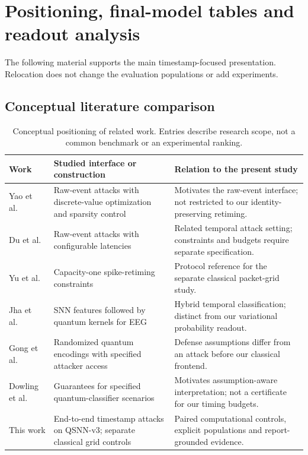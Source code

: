 \section{Positioning, final-model tables and readout analysis}
\label{sec:revision_details}
The following material supports the main timestamp-focused presentation. Relocation does not change the evaluation populations or add experiments.

\subsection{Conceptual literature comparison}
\begin{table}[H]
\centering
\small
\caption{Conceptual positioning of related work. Entries describe research scope, not a common benchmark or an experimental ranking.}
\label{tab:supp_literature_scope}
\begin{tabular}{p{}p{}p{}}
\hline
Work & Studied interface or construction & Relation to the present study \\
\hline
Yao et al.\ \cite{yao2024rawevent} & Raw-event attacks with discrete-value optimization and sparsity control & Motivates the raw-event interface; not restricted to our identity-preserving retiming. \\
Du et al.\ \cite{du2026latencies} & Raw-event attacks with configurable latencies & Related temporal attack setting; constraints and budgets require separate specification. \\
Yu et al.\ \cite{yu2026} & Capacity-one spike-retiming constraints & Protocol reference for the separate classical packet-grid study. \\
Jha et al.\ \cite{jha2025hybrid} & SNN features followed by quantum kernels for EEG & Hybrid temporal classification; distinct from our variational probability readout. \\
Gong et al.\ \cite{gong2024randomized} & Randomized quantum encodings with specified attacker access & Defense assumptions differ from an attack before our classical frontend. \\
Dowling et al.\ \cite{dowling2026guarantees} & Guarantees for specified quantum-classifier scenarios & Motivates assumption-aware interpretation; not a certificate for our timing budgets. \\
This work & End-to-end timestamp attacks on QSNN-v3; separate classical grid controls & Paired computational controls, explicit populations and report-grounded evidence. \\
\hline
\end{tabular}
\end{table}

